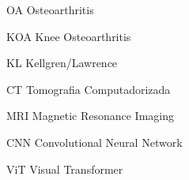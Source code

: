 \documentclass[
	12pt,					%
	openright,				%
	twoside,					%
	a4paper,					%
	english,					%
	brazil					%
	]{abntex2}
\begin{document}
\frenchspacing

\pretextual



\imprimirfolhaderosto*

% 

% 

% 

% 

% 

% 



\begin{siglas}
  \item[OA] Osteoarthritis
  \item[KOA] Knee Osteoarthritis
  \item[KL] Kellgren/Lawrence
  \item[CT] Tomografia Computadorizada
  \item[MRI] Magnetic Resonance Imaging
  \item[CNN] Convolutional Neural Network
  \item[ViT] Visual Transformer
\end{siglas}


\tableofcontents*
\cleardoublepage
\end{document}
